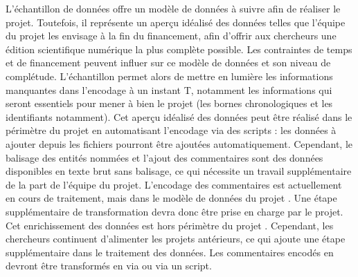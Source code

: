 L'échantillon de données offre un modèle de données à suivre afin de réaliser le projet. Toutefois, il représente un aperçu idéalisé des données telles que l'équipe du projet les envisage à la fin du financement, afin d'offrir aux chercheurs une édition scientifique numérique la plus complète possible. Les contraintes de temps et de financement peuvent influer sur ce modèle de données et son niveau de complétude. L'échantillon permet alors de mettre en lumière les informations manquantes dans l'encodage à un instant T, notamment les informations qui seront essentiels pour mener à bien le projet (les bornes chronologiques et les identifiants \XML notamment). Cet aperçu idéalisé des données peut être réalisé dans le périmètre du projet en automatisant l'encodage via des scripts : les données à ajouter depuis les fichiers \JSON pourront être ajoutées automatiquement. Cependant, le balisage des entités nommées et l'ajout des commentaires sont des données disponibles en texte brut sans balisage, ce qui nécessite un travail supplémentaire de la part de l'équipe du projet. L'encodage des commentaires est actuellement en cours de traitement, mais dans le modèle de données du projet \LSC. Une étape supplémentaire de transformation devra donc être prise en charge par le projet. Cet enrichissement des données \LSC est hors périmètre du projet \COREL. Cependant, les chercheurs continuent d'alimenter les projets antérieurs, ce qui ajoute une étape supplémentaire dans le traitement des données. Les commentaires encodés en \XML devront être transformés en \TEI via \XSLT ou via un script. 

